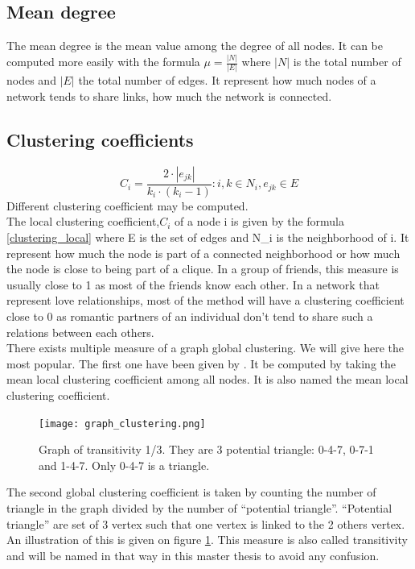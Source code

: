 \documentclass[a4paper, 12pt]{report}
\begin{document}
\subsection{Mean degree}
The mean degree is the mean value among the degree of all nodes. It can be computed more easily with the formula $\mu = \frac{|N|}{|E|}$ where $|N|$ is the total number of nodes and $|E|$ the total number of edges. It represent how much nodes of a network tends to share links, how much the network is connected.

\subsection{Clustering coefficients}
\begin{equation}
C_i = \frac{2 \cdot |e_{jk}|}{k_i \cdot (k_i - 1)}: i, k \in N_i, e_{jk} \in E
\label{clustering_local}
\end{equation}
Different clustering coefficient may be computed.\\
The local clustering coefficient,$C_i$ of a node i is given by the formula \ref{clustering_local} where E is the set of edges and N_i is the neighborhood of i. It represent how much the node is part of a connected neighborhood or how much the node is close to being part of a clique. In a group of friends, this measure is usually close to 1 as most of the friends know each other. In a network that represent love relationships, most of the method will have a clustering coefficient close to 0 as romantic partners of an individual don't tend to share such a relations between each others.\\

There exists multiple measure of a graph global clustering. We will give here the most popular. The first one have been given by \cite{globalClustering1}. It be computed by taking the mean local clustering coefficient among all nodes. It is also named the mean local clustering coefficient.  \\

\begin{figure}
\centering
\texttt{[image: graph\_clustering.png]}
\caption{Graph of transitivity 1/3. They are 3 potential triangle: 0-4-7, 0-7-1 and 1-4-7. Only 0-4-7 is a triangle. }
\label{transitivity}
\end{figure}

The second global clustering coefficient is taken by counting the number of triangle in the graph divided by the number of ``potential triangle''. ``Potential triangle'' are set of 3 vertex such that one vertex is linked to the 2 others vertex. An illustration of this is given on figure \ref{transitivity}. This measure is also called transitivity and will be named in that way in this master thesis to avoid any confusion. \\
\end{document}

